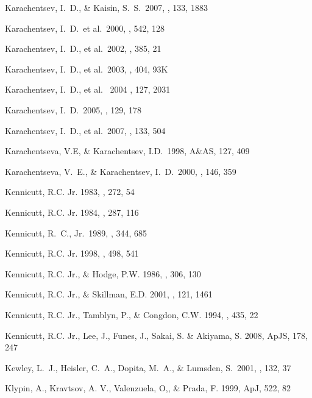 \documentclass[12pt,preprint]{emulateapj}
\begin{document}
\begin{thebibliography}{}
Karachentsev, I.~D., \& Kaisin, S.~S.\ 2007, \aj, 133, 1883 

Karachentsev, I.~D.~et al.\ 2000, \apj, 542, 128 

Karachentsev, I.~D., et al.\ 2002, \aap, 385, 21

Karachentsev, I.~D., et al.\ 2003, \aap, 404, 93K 

Karachentsev, I.~D., et al. \ 2004 \aj, 127, 2031

Karachentsev, I.~D.\ 2005, \aj, 129, 178 

Karachentsev, I.~D., et al.\ 2007, \aj, 133, 504 

Karachentseva, V.E, \& Karachentsev, I.D.\ 1998, A\&AS, 127, 409 

Karachentseva, V.~E., \& Karachentsev, I.~D.\ 2000, \aaps, 146, 359 

Kennicutt, R.C. Jr. 1983, \apj , 272, 54

Kennicutt, R.C. Jr. 1984, \apj , 287, 116

Kennicutt, R.~C., Jr.\ 1989, \apj, 344, 685 

Kennicutt, R.C. Jr. 1998, \apj , 498, 541

Kennicutt, R.C. Jr., \& Hodge, P.W. 1986, \apj , 306, 130

Kennicutt, R.C. Jr., \& Skillman, E.D. 2001, \aj , 121, 1461 

Kennicutt, R.C. Jr., Tamblyn, P., \& Congdon, C.W. 1994, \apj , 435, 22

Kennicutt, R.C. Jr., Lee, J., Funes, J., Sakai, S. \& Akiyama, S. 2008, ApJS, 178, 247

Kewley, L.~J., Heisler, C.~A., Dopita, M.~A., \& Lumsden, S.\ 2001, \apjs, 132, 37 

Klypin, A., Kravtsov, A. V., Valenzuela, O,, \& Prada, F. 1999, ApJ, 522, 82


\end{thebibliography}
\end{document}
